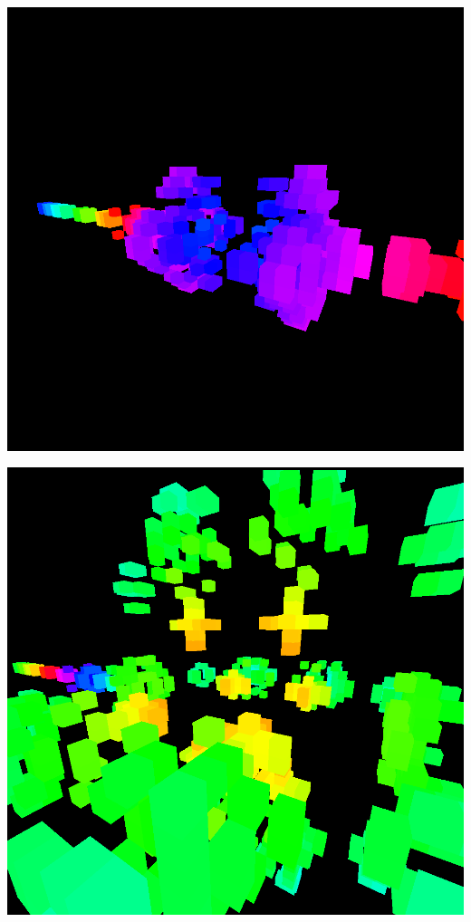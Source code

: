 \documentclass[11pt]{article}
\begin{document}
\begin{center}
\includegraphics[width=.9\linewidth]{img/2-3.png}
\end{center}

\begin{center}
\includegraphics[width=.9\linewidth]{img/3-3.png}
\end{center}
\end{document}
